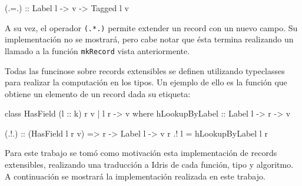\begin{code}
(.=.) :: Label l -> v -> Tagged l v
\end{code}

A su vez, el operador \texttt{(.*.)} permite extender un record con un nuevo campo. Su implementación no se mostrará, pero cabe notar que ésta termina realizando un llamado a la función \texttt{mkRecord} vista anteriormente.

Todas las funcinose sobre records extensibles se definen utilizando typeclasses para realizar la computación en los tipos. Un ejemplo de ello es la función que obtiene un elemento de un record dada su etiqueta:

\begin{code}
class HasField (l :: k) r v | l r -> v where
  hLookupByLabel :: Label l -> r -> v

(.!.) :: (HasField l r v) => r -> Label l -> v
r .! l = hLookupByLabel l r
\end{code}

Para este trabajo se tomó como motivación esta implementación de records extensibles, realizando una traducción a Idris de cada función, tipo y algoritmo. A continuación se mostrará la implementación realizada en este trabajo.
